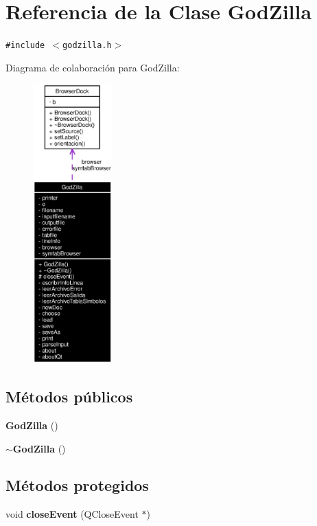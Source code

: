 \section{Referencia de la Clase God\-Zilla}
\label{classGodZilla}
{\tt \#include $<$godzilla.h$>$}

Diagrama de colaboraci\'{o}n para God\-Zilla:\begin{figure}[H]
\begin{center}
\leavevmode
\includegraphics[width=87pt]{classGodZilla__coll__graph}
\end{center}
\end{figure}
\subsection*{M\'{e}todos p\'{u}blicos}
\begin{CompactItemize}
\item 
{\bf God\-Zilla} ()
\item 
{\bf $\sim$God\-Zilla} ()
\end{CompactItemize}
\subsection*{M\'{e}todos protegidos}
\begin{CompactItemize}
\item 
void {\bf close\-Event} (QClose\-Event $\ast$)
\end{CompactItemize}
